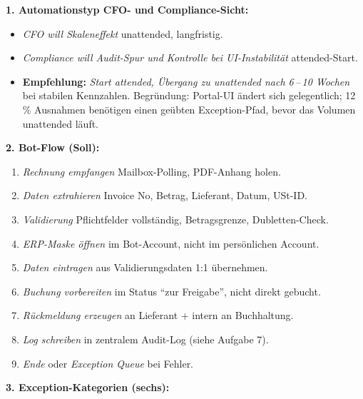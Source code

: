\documentclass[11pt,a4paper,oneside]{article}
\begin{document}
\begin{loesungbox}
\textbf{1. Automationstyp \textendash{} CFO- und Compliance-Sicht:}
\begin{itemize}
  \item \emph{CFO will Skaleneffekt} \textrightarrow{} unattended, langfristig.
  \item \emph{Compliance will Audit-Spur und Kontrolle bei UI-Instabilit\"at} \textrightarrow{} attended-Start.
  \item \textbf{Empfehlung:} \emph{Start attended, \"Ubergang zu unattended nach 6\,--\,10 Wochen} bei stabilen Kennzahlen. Begr\"undung: Portal-UI \"andert sich gelegentlich; 12\,\% Ausnahmen ben\"otigen einen ge\"ubten Exception-Pfad, bevor das Volumen unattended l\"auft.
\end{itemize}

\smallskip
\textbf{2. Bot-Flow (Soll):}
\begin{enumerate}
  \item \emph{Rechnung empfangen} \textendash{} Mailbox-Polling, PDF-Anhang holen.
  \item \emph{Daten extrahieren} \textendash{} Invoice No, Betrag, Lieferant, Datum, USt-ID.
  \item \emph{Validierung} \textendash{} Pflichtfelder vollst\"andig, Betragsgrenze, Dubletten-Check.
  \item \emph{ERP-Maske \"offnen} \textendash{} im Bot-Account, nicht im pers\"onlichen Account.
  \item \emph{Daten eintragen} \textendash{} aus Validierungsdaten 1:1 \"ubernehmen.
  \item \emph{Buchung vorbereiten} \textendash{} im Status ``zur Freigabe'', nicht direkt gebucht.
  \item \emph{R\"uckmeldung erzeugen} \textendash{} an Lieferant + intern an Buchhaltung.
  \item \emph{Log schreiben} \textendash{} in zentralem Audit-Log (siehe Aufgabe 7).
  \item \emph{Ende} oder \emph{Exception Queue} \textendash{} bei Fehler.
\end{enumerate}

\smallskip
\textbf{3. Exception-Kategorien (sechs):}


\end{loesungbox}
\end{document}

